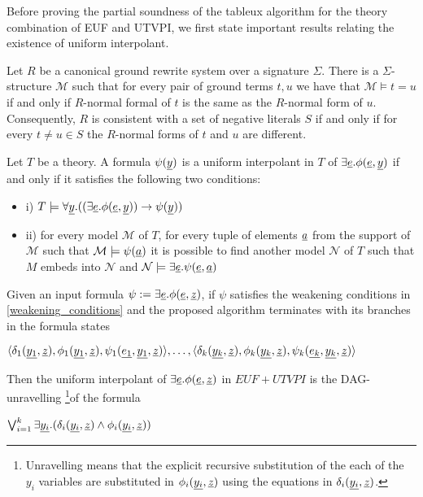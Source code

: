 Before proving the partial soundness of the tableux algorithm 
for the theory combination of EUF and UTVPI, we first state
important results relating the existence of uniform 
interpolant.

\begin{lemma} \cite{ghilardi2020compactly} \label{rewriting_model_existance}
  Let $R$ be a canonical ground rewrite system over a signature
  $\Sigma$. There is a $\Sigma$-structure $\mathcal{M}$
  such that for every pair of ground terms $t, u$ we have
  that $\mathcal{M} \models t = u$ if and only if 
  $R$-normal formal of $t$ is the same as the $R$-normal form of
  $u$. Consequently, $R$ is consistent with a set of negative 
  literals $S$ if and only if for every $t \neq u \in S$ 
  the $R$-normal forms of $t$ and $u$ are different.
\end{lemma}

\begin{lemma} \cite{10.1007/978-3-030-29436-6_9} \label{cover_extension_lemma}
  Let $T$ be a theory. 
  A formula $\psi(\underline{y})$ is a uniform interpolant
  in $T$ of $\exists \underline{e} . \phi (\underline{e}, \underline{y})$
  if and only if it satisfies the following two conditions:

  \begin{itemize}
    \item[] i) $T \models \forall \underline{y}. ((\exists \underline{e} . 
    \phi(\underline{e}, \underline{y})) \rightarrow \psi(\underline{y}))$
  \item[] ii) for every model $\mathcal{M}$ of $T$, for every
  tuple of elements $\underline{a}$ from the support of $\mathcal{M}$
  such that $\mathcal{M} \models \psi(\underline{a})$ it is 
  possible to find another model $\mathcal{N}$ of $T$
  such that $M$ embeds into $\mathcal{N}$ and $\mathcal{N}
  \models \exists \underline{e} . \psi (\underline{e}, \underline{a})$
  \end{itemize}
\end{lemma}

\begin{theorem}
  Given an input formula
  $\psi := \exists \underline{e}. \phi(\underline{e}, \underline{z})$, 
  if $\psi$ satisfies the weakening conditions in 
  \ref{weakening_conditions} and the proposed algorithm
  terminates with its branches in the formula states

  $\langle 
  \delta_1(\underline{y_1}, \underline{z}), 
  \phi_1(\underline{y_1}, \underline{z}),
  \psi_1(\underline{e_1}, \underline{y_1}, \underline{z})
  \rangle, \dots, \langle 
  \delta_k(\underline{y_k}, \underline{z}), 
  \phi_k(\underline{y_k}, \underline{z}),
  \psi_k(\underline{e_k}, \underline{y_k}, \underline{z})
  \rangle$

  Then the uniform interpolant of $\exists \underline{e} . \phi(\underline{e},
\underline{z})$ in $EUF + UTVPI$ is the DAG-unravelling \footnote{
  Unravelling means that the explicit recursive 
  substitution of the each of the $y_i$
  variables are substituted in $\phi_i(\underline{y_i}, \underline{z})$ using
  the equations in $\delta_i(\underline{y_i}, \underline{z})$.
}of the formula 

$\bigvee_{i=1}^k \exists \underline{y_i} . (\delta_i(\underline{y_i}, \underline{z}) \land \phi_i(\underline{y_i}, \underline{z}))$

\end{theorem}

